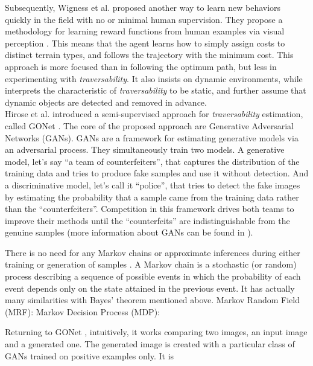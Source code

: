\documentclass[12pt,a4paper]{report}
\newcommand{\etal}[1]{#1 et al.}
\newcommand{\alleg}{\enquote}
\newcommand{\term}{\textit}
\newcommand{\acronym}{\MakeUppercase}
\begin{document}
	Subsequently, \etal{Wigness} proposed another way to learn new behaviors quickly 
	in the field with no or minimal human supervision. They propose a methodology 
	for learning reward functions from human examples via visual perception 
	\cite{Wigness}. This means that the agent learns how to simply assign costs to 
	distinct terrain types, and follows the trajectory with the minimum cost. This 
	approach is more focused than \cite{Suger} in following the optimum path, but 
	less in experimenting with \term{traversability}. It also insists on dynamic 
	environments, while \cite{Suger} interprets the characteristic of 
	\term{traversability} to be static, and further assume that dynamic objects are 
	detected and removed in advance.
	\\
	
	\etal{Hirose} introduced a semi-supervised approach for \term{traversability} 
	estimation, called GONet \cite{HiroseGonet}. The core of the proposed approach 
	are Generative Adversarial Networks (\acronym{gan}s). \acronym{gan}s are a 
	framework for estimating generative models via an adversarial process. They 
	simultaneously train two models. A generative model, let's say \alleg{a team of 
	counterfeiters}, that captures the distribution of the training data and tries 
	to produce fake samples and use it without detection. And a discriminative model, 
	let's call it \alleg{police}, that tries to detect the fake images by estimating 
	the probability that a sample came from the training data rather than the 
	\alleg{counterfeiters}. Competition in this framework drives both teams to 
	improve their methods until the \alleg{counterfeits} are indistinguishable from 
	the genuine samples (more information about \acronym{gan}s can be found in 
	\cite{Goodfellow}).
	\par
	There is no need for any Markov chains or approximate inferences during either 
	training or generation of samples \cite{Goodfellow}. A Markov chain is a 
	stochastic (or random) process describing a sequence of possible events in which 
	the probability of each event depends only on the state attained in the previous 
	event. It has actually many similarities with Bayes' theorem mentioned above.
	Markov Random Field (\acronym{mrf}): \cite{Pfaff, Lalonde}
	Markov Decision Process (\acronym{mdp}): \cite{Wigness, Zhelo}
	\par
	Returning to GONet \cite{HiroseGonet}, intuitively, it works comparing two images, 
	an input image and a generated one. The generated image is created with a 
	particular class of \acronym{gan}s trained on positive examples only. It is 
\end{document}
